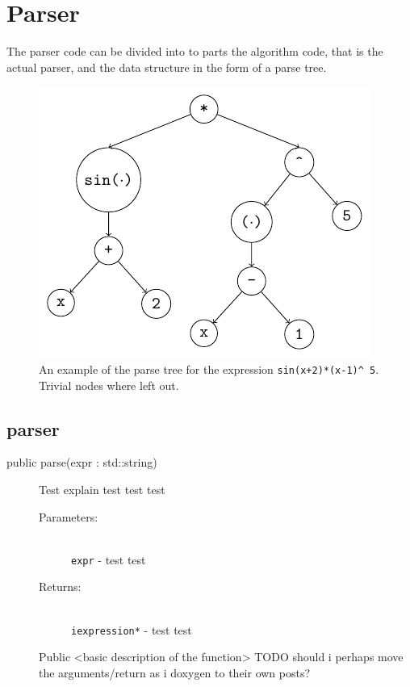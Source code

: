 \documentclass[a4paper,11pt]{kth-mag}
\begin{document}
\section{Parser}
The parser code can be divided into to parts the algorithm code, that is the 
actual parser, and the data structure in the form of a parse tree.

\begin{figure}[ht]
\begin{center}
    \includegraphics[width=\textwidth]{parse-tree.pdf}
    \caption{\small{
        An example of the parse tree for the
        expression \texttt{sin(x+2)*(x-1)}\texttt{\^~}\!\!\texttt{5}.
        Trivial nodes where left out.
    }}
   \label{fig:parsetree}
\end{center}
\end{figure}

\subsection{parser}

\begin{description}
    \item[public parse(expr : std::string)] 
        Test explain test test test
        \begin{description}
            \item[Parameters:]~\\
                \verb+expr+ - test test
            \item[Returns:]~\\
                \verb+iexpression*+ - test test

        \end{description}
        Public <basic description of the function> TODO should i perhaps move the arguments/return as i doxygen to their own posts?
\end{description}
\end{document}
